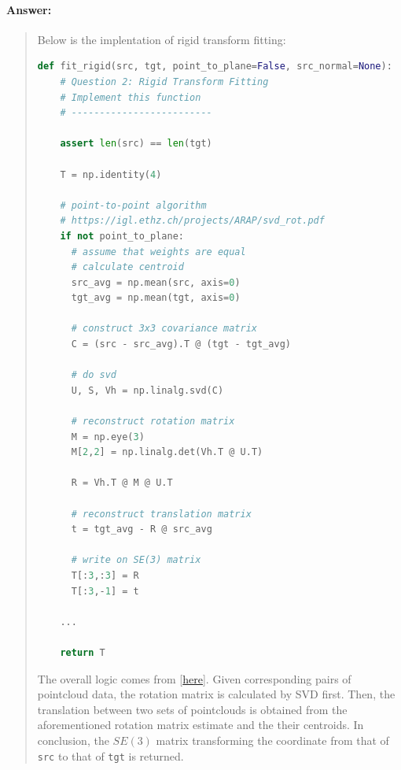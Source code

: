 \documentclass[11pt]{article}
\begin{document}
\paragraph{Answer:} 
\begin{quote}

Below is the implentation of rigid transform fitting:

\begin{lstlisting}[language=Python, basicstyle=\scriptsize]
def fit_rigid(src, tgt, point_to_plane=False, src_normal=None):
    # Question 2: Rigid Transform Fitting
    # Implement this function
    # -------------------------
  
    assert len(src) == len(tgt)
  
    T = np.identity(4)
    
    # point-to-point algorithm
    # https://igl.ethz.ch/projects/ARAP/svd_rot.pdf
    if not point_to_plane:
      # assume that weights are equal
      # calculate centroid
      src_avg = np.mean(src, axis=0)
      tgt_avg = np.mean(tgt, axis=0)
      
      # construct 3x3 covariance matrix
      C = (src - src_avg).T @ (tgt - tgt_avg)
      
      # do svd 
      U, S, Vh = np.linalg.svd(C)
      
      # reconstruct rotation matrix
      M = np.eye(3)
      M[2,2] = np.linalg.det(Vh.T @ U.T)
      
      R = Vh.T @ M @ U.T
  
      # reconstruct translation matrix
      t = tgt_avg - R @ src_avg
      
      # write on SE(3) matrix
      T[:3,:3] = R
      T[:3,-1] = t
    
    ...
    
    return T
\end{lstlisting}

The overall logic comes from [\href{https://igl.ethz.ch/projects/ARAP/svd_rot.pdf}{here}]. Given corresponding pairs of pointcloud data, the rotation matrix is calculated by SVD first. Then, the translation between two sets of pointclouds is obtained from the aforementioned rotation matrix estimate and the their centroids. In conclusion, the $SE(3)$ matrix transforming the coordinate from that of \texttt{src} to that of \texttt{tgt} is returned.



\end{quote}
\end{document}
